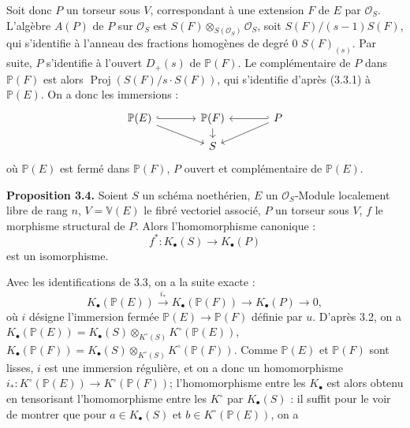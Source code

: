 Soit donc $P$ un torseur sous $V$, correspondant à une extension $F$ de $E$ par $\mathcal O_S$. L'algèbre $A(P)$ de $P$ sur $\mathcal O_S$ est $S(F)\otimes_{S(\mathcal O_S)}\mathcal O_S$, soit $S(F)/(s-1)S(F)$, qui s'identifie à l'anneau des fractions homogènes de degré $0$ $S(F)_{(s)}$. Par suite, $P$ s'identifie à l'ouvert $D_+(s)$ de $\mathbb P(F)$. Le complémentaire de $P$ dans $\mathbb P(F)$ est alors $\operatorname{Proj}(S(F)/s\cdot S(F))$, qui s'identifie d'après (3.3.1) à $\mathbb P(E)$. On a donc les immersions :
\[
\begin{tikzcd}[column sep=large,row sep=small]
\mathbb P(E) \arrow[r,hook] \arrow[dr] & \mathbb P(F) \arrow[d] & P \arrow[l,hook'] \arrow[dl]\\
& S &
\end{tikzcd}
\]
où $\mathbb P(E)$ est fermé dans $\mathbb P(F)$, $P$ ouvert et complémentaire de $\mathbb P(E)$.

\textbf{Proposition 3.4.} Soient $S$ un schéma noethérien, $E$ un $\mathcal O_S$-Module localement libre de rang $n$, $V=\mathbb V(E)$ le fibré vectoriel associé, $P$ un torseur sous $V$, $f$ le morphisme structural de $P$. Alors l'homomorphisme canonique :
\[
f^*:K_\bullet(S)\longrightarrow K_\bullet(P)
\]
est un isomorphisme.

Avec les identifications de 3.3, on a la suite exacte :
\[
K_\bullet(\mathbb P(E))\xrightarrow{i_*}K_\bullet(\mathbb P(F))\longrightarrow K_\bullet(P)\longrightarrow 0,
\tag{3.4.1}
\]
où $i$ désigne l'immersion fermée $\mathbb P(E)\to \mathbb P(F)$ définie par $u$. D'après 3.2, on a $K_\bullet(\mathbb P(E))=K_\bullet(S)\otimes_{K^\circ(S)}K^\circ(\mathbb P(E))$, $K_\bullet(\mathbb P(F))=K_\bullet(S)\otimes_{K^\circ(S)}K^\circ(\mathbb P(F))$.
Comme $\mathbb P(E)$ et $\mathbb P(F)$ sont lisses, $i$ est une immersion régulière, et on a donc un homomorphisme $i_*:K^\circ(\mathbb P(E))\to K^\circ(\mathbb P(F))$; l'homomorphisme entre les $K_\bullet$ est alors obtenu en tensorisant l'homomorphisme entre les $K^\circ$ par $K_\bullet(S)$ : il suffit pour le voir de montrer que pour $a\in K_\bullet(S)$ et $b\in K^\circ(\mathbb P(E))$, on a
